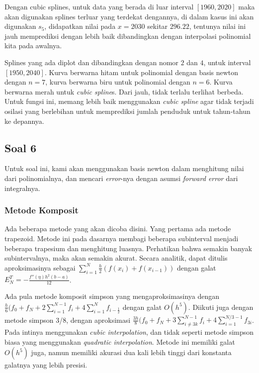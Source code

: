 \documentclass[11pt, a4paper, onecolumn, oneside, final]{report}
\begin{document}
Dengan cubic splines, untuk data yang berada di luar interval $[1960, 2020]$ maka akan digunakan splines terluar yang terdekat dengannya, di dalam kasus ini akan digunakan $s_5$, didapatkan nilai pada $x = 2030$ sekitar $296.22$, tentunya nilai ini jauh memprediksi dengan lebih baik dibandingkan dengan interpolasi polinomial kita pada awalnya.

Splines yang ada diplot dan dibandingkan dengan nomor $2$ dan $4$, untuk interval $[1950, 2040]$. Kurva berwarna hitam untuk polinomial dengan basis newton dengan $n = 7$, kurva berwarna biru untuk polinomial dengan $n = 6$. Kurva berwarna merah untuk \textit{cubic spline}s. Dari jauh, tidak terlalu terlihat berbeda. Untuk fungsi ini, memang lebih baik menggunakan \textit{cubic spline} agar tidak terjadi osilasi yang berlebihan untuk memprediksi jumlah penduduk untuk tahun-tahun ke depannya.

\subsection*{Soal 6}

Untuk soal ini, kami akan menggunakan basis newton dalam menghitung nilai dari polinomialnya, dan mencari \textit{error}-nya dengan asumsi \textit{forward error} dari integralnya.

\subsubsection*{Metode Komposit}

Ada beberapa metode yang akan dicoba disini. Yang pertama ada metode trapezoid. Metode ini pada dasarnya membagi beberapa subinterval menjadi beberapa trapesium dan menghitung luasnya. Perhatikan bahwa semakin banyak subintervalnya, maka akan semakin akurat. Secara analitik, dapat ditulis aproksimasinya sebagai $\sum_{i = 1}^N \frac{h}{2}(f(x_i) + f(x_{i - 1}))$ dengan galat $E_N^T = -\frac{f''(\eta)h^2(b-a)}{12}$. 

Ada pula metode komposit simpson yang mengaproksimasinya dengan $\frac{h}{6}(f_0 + f_N + 2 \sum_{i = 1}^{N - 1}f_i + 4 \sum_{i = 1}^N f_{i - \frac{1}{2}}$ dengan galat $O(h^5)$. Diikuti juga dengan metode simpson 3/8, dengan aproksimasi $\frac{3h}{8}(f_0 + f_N + 3 \sum_{i \ne 3k}^{N - 1}f_i + 4 \sum_{i = 1}^{N/3 - 1} f_{3i}$. Pada intinya menggunakan \textit{cubic interpolation}, dan tidak seperti metode simpson biasa yang menggunakan \textit{quadratic interpolation}. Metode ini memiliki galat $O(h^5)$ juga, namun memiliki akurasi dua kali lebih tinggi dari konstanta galatnya yang lebih presisi.
\end{document}
